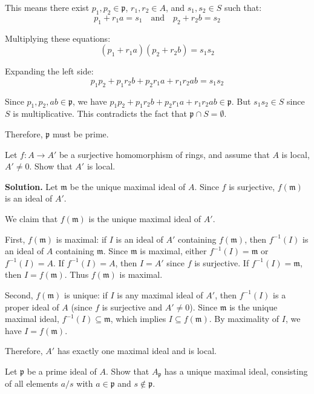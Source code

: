 This means there exist $p_1, p_2 \in \mathfrak{p}$, $r_1, r_2 \in A$, and $s_1, s_2 \in S$ such that:
\[ p_1 + r_1a = s_1 \quad \text{and} \quad p_2 + r_2b = s_2 \]

Multiplying these equations:
\[ (p_1 + r_1a)(p_2 + r_2b) = s_1s_2 \]

Expanding the left side:
\[ p_1p_2 + p_1r_2b + p_2r_1a + r_1r_2ab = s_1s_2 \]

Since $p_1, p_2, ab \in \mathfrak{p}$, we have $p_1p_2 + p_1r_2b + p_2r_1a + r_1r_2ab \in \mathfrak{p}$. But $s_1s_2 \in S$ since $S$ is multiplicative. This contradicts the fact that $\mathfrak{p} \cap S = \emptyset$.

Therefore, $\mathfrak{p}$ must be prime.

\begin{problembox}
Let $f: A \rightarrow A'$ be a surjective homomorphism of rings, and assume that $A$ is local, $A' \neq 0$. Show that $A'$ is local.
\end{problembox}

\noindent\textbf{Solution.}
Let $\mathfrak{m}$ be the unique maximal ideal of $A$. Since $f$ is surjective, $f(\mathfrak{m})$ is an ideal of $A'$.

We claim that $f(\mathfrak{m})$ is the unique maximal ideal of $A'$.

First, $f(\mathfrak{m})$ is maximal: if $I$ is an ideal of $A'$ containing $f(\mathfrak{m})$, then $f^{-1}(I)$ is an ideal of $A$ containing $\mathfrak{m}$. Since $\mathfrak{m}$ is maximal, either $f^{-1}(I) = \mathfrak{m}$ or $f^{-1}(I) = A$. If $f^{-1}(I) = A$, then $I = A'$ since $f$ is surjective. If $f^{-1}(I) = \mathfrak{m}$, then $I = f(\mathfrak{m})$. Thus $f(\mathfrak{m})$ is maximal.

Second, $f(\mathfrak{m})$ is unique: if $I$ is any maximal ideal of $A'$, then $f^{-1}(I)$ is a proper ideal of $A$ (since $f$ is surjective and $A' \neq 0$). Since $\mathfrak{m}$ is the unique maximal ideal, $f^{-1}(I) \subseteq \mathfrak{m}$, which implies $I \subseteq f(\mathfrak{m})$. By maximality of $I$, we have $I = f(\mathfrak{m})$.

Therefore, $A'$ has exactly one maximal ideal and is local.

\begin{problembox}
Let $\mathfrak{p}$ be a prime ideal of $A$. Show that $A_{\mathfrak{p}}$ has a unique maximal ideal, consisting of all elements $a/s$ with $a \in \mathfrak{p}$ and $s \notin \mathfrak{p}$.
\end{problembox}


